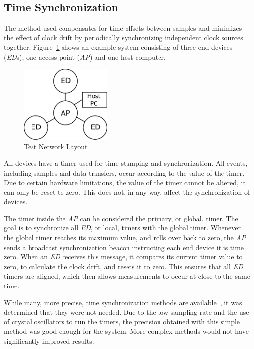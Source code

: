 \documentclass{article}
\begin{document}
\subsection{Time Synchronization}
The method used compensates for time offsets between samples and minimizes the effect of clock drift by periodically synchronizing independent clock sources together. Figure~\ref{fig:network_layout} shows an example system consisting of three end devices (\emph{ED}s), one access point (\emph{AP}) and one host computer. 
\begin{figure}[htb]
\begin{center}
\includegraphics[width=0.4\textwidth]{figures/network-map-test2.pdf}
\end{center}
\caption{Test Network Layout}
\label{fig:network_layout}
\end{figure}
All devices have a timer used for time-stamping and synchronization. All events, including samples and data transfers, occur according to the value of the timer. Due to certain hardware limitations, the value of the timer cannot be altered, it can only be reset to zero. This does not, in any way, affect the synchronization of devices.

The timer inside the \emph{AP} can be considered the primary, or global, timer. The goal is to synchronize all \emph{ED}, or local, timers with the global timer. Whenever the global timer reaches its maximum value, and rolls over back to zero, the \emph{AP} sends a broadcast synchronization beacon instructing each end device it is time zero. When an \emph{ED} receives this message, it compares its current timer value to zero, to calculate the clock drift, and resets it to zero. This ensures that all \emph{ED} timers are aligned, which then allows measurements to occur at close to the same time.

While many, more precise, time synchronization methods are available~\cite{synchronization:FTSP}, it was determined that they were not needed. Due to the low sampling rate and the use of crystal oscillators to run the timers, the precision obtained with this simple method was good enough for the system. More complex methods would not have significantly improved results.
\end{document}
